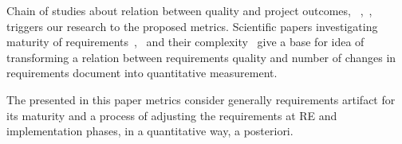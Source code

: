 Chain of studies about relation between quality and project outcomes, ~\cite{Verner:2005},~\cite{Kamata:2007},~\cite{Noorwali:2015} triggers our research to the proposed metrics. Scientific papers investigating maturity of requirements~\cite{Basili:1981},~\cite{FARBEY:1990} and their complexity~\cite{Antinyan:2016} give a base for idea of transforming a relation between requirements quality and number of changes in requirements document into quantitative measurement.

The presented in this paper metrics consider generally requirements artifact for its maturity and a process 
of adjusting the requirements at RE and implementation phases, in a quantitative way, a posteriori.


%
%
%
